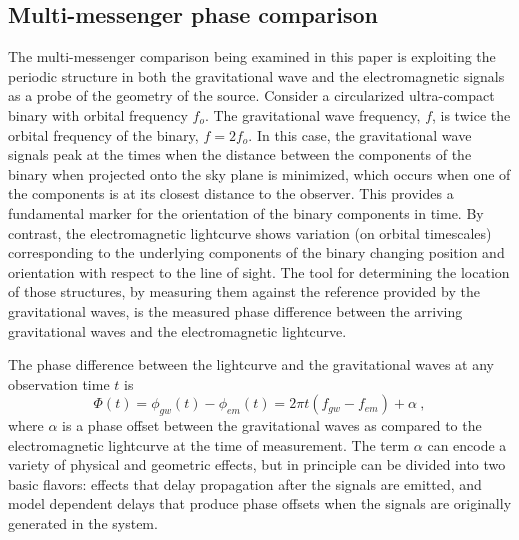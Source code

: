 \documentclass[preprint2]{aastex}
\begin{document}
\subsection{Multi-messenger phase comparison}\label{sub.emGWphase}
The multi-messenger comparison being examined in this paper is
exploiting the periodic structure in both the gravitational wave and
the electromagnetic signals as a probe of the geometry of the source.
Consider a circularized ultra-compact binary with orbital frequency
$f_{o}$.  The gravitational wave frequency, $f$, is twice the orbital
frequency of the binary, $f = 2 f_{o}$.  In this case, the
gravitational wave signals peak at the times when the distance between the components of
the binary when projected onto the sky plane is minimized, which occurs when one of the components is at its closest distance to the observer. This provides a fundamental marker for the
orientation of the binary components in time.  By contrast, the
electromagnetic lightcurve shows variation (on orbital timescales)
corresponding to the underlying components of the binary changing
position and orientation with respect to the line of sight.  The tool
for determining the location of those structures, by measuring them
against the reference provided by the gravitational waves, is the
measured phase difference between the arriving gravitational waves and
the electromagnetic lightcurve.

The phase difference between the lightcurve and the gravitational 
waves at any observation time $t$ is
\begin{equation}
    \Phi(t) = \phi_{gw}(t) - \phi_{em}(t) = 2\pi t(f_{gw}-f_{em}) + 
    \alpha \ ,
    \label{eqn.phaseDifference}
\end{equation}
where $\alpha$ is a phase offset between the gravitational waves as
compared to the electromagnetic lightcurve at the time of
measurement.  The term $\alpha$ can encode a variety of physical and
geometric effects, but in principle can be divided into two basic 
flavors: effects that delay propagation after the signals are 
emitted, and model dependent delays that produce phase offsets when 
the signals are originally generated in the system.
\end{document}
